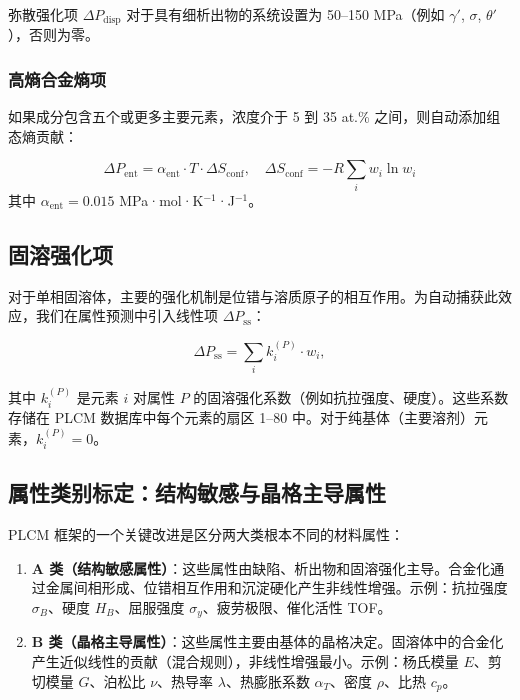 \documentclass[12pt,a4paper]{article}
\begin{document}
	弥散强化项 \(\Delta P_{\text{disp}}\) 对于具有细析出物的系统设置为 50–150 MPa（例如 \(\gamma'\), \(\sigma\), \(\theta'\)），否则为零。
	
	\subsubsection{高熵合金熵项}
	如果成分包含五个或更多主要元素，浓度介于 5 到 35 at.\% 之间，则自动添加组态熵贡献：
	
	\begin{equation}
		\Delta P_{\text{ent}} = \alpha_{\text{ent}} \cdot T \cdot \Delta S_{\text{conf}}, \quad
		\Delta S_{\text{conf}} = -R \sum_i w_i \ln w_i
	\end{equation}
	其中 \(\alpha_{\text{ent}} = 0.015\) MPa·mol·K\(^{-1}\)·J\(^{-1}\)。
	
	\subsection{固溶强化项}
	\label{subsec:ss-term}
	
	对于单相固溶体，主要的强化机制是位错与溶质原子的相互作用。为自动捕获此效应，我们在属性预测中引入线性项 \(\Delta P_{\text{ss}}\)：
	
	\begin{equation}
		\Delta P_{\text{ss}} = \sum_i k_i^{(P)} \cdot w_i,
		\label{eq:ss-term}
	\end{equation}
	
	其中 \(k_i^{(P)}\) 是元素 \(i\) 对属性 \(P\) 的固溶强化系数（例如抗拉强度、硬度）。这些系数存储在 PLCM 数据库中每个元素的扇区 1–80 中。对于纯基体（主要溶剂）元素，\(k_i^{(P)} = 0\)。
	
	\subsection{属性类别标定：结构敏感与晶格主导属性}
	\label{subsec:property-class-calibration}
	
	PLCM 框架的一个关键改进是区分两大类根本不同的材料属性：
	
	\begin{enumerate}
		\item \textbf{A 类（结构敏感属性）}：这些属性由缺陷、析出物和固溶强化主导。合金化通过金属间相形成、位错相互作用和沉淀硬化产生非线性增强。示例：抗拉强度 \(\sigma_B\)、硬度 \(H_B\)、屈服强度 \(\sigma_y\)、疲劳极限、催化活性 TOF。
		
		\item \textbf{B 类（晶格主导属性）}：这些属性主要由基体的晶格决定。固溶体中的合金化产生近似线性的贡献（混合规则），非线性增强最小。示例：杨氏模量 \(E\)、剪切模量 \(G\)、泊松比 \(\nu\)、热导率 \(\lambda\)、热膨胀系数 \(\alpha_T\)、密度 \(\rho\)、比热 \(c_p\)。
	\end{enumerate}
	
\end{document}
